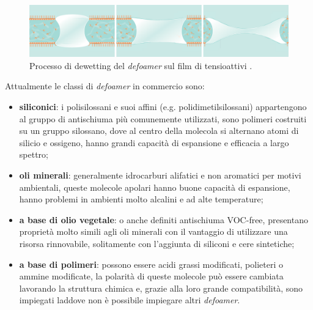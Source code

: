 \begin{figure}[htbp]
    \centering
    \includegraphics[height=.11\textheight]{fig/foamer/dewetting.png}
    \caption{Processo di dewetting del \textit{defoamer} sul film di tensioattivi \parencite{tego2014brochure}.}
    \label{fig:dewetting}
\end{figure}

Attualmente le classi di \textit{defoamer} in commercio sono:
\begin{itemize}
    \item \textbf{siliconici}: i polisilossani e suoi affini (e.g. polidimetilsilossani) appartengono al gruppo di antischiuma più comunemente utilizzati, sono polimeri costruiti su un gruppo silossano, dove al centro della molecola si alternano atomi di silicio e ossigeno, hanno grandi capacità di espansione e efficacia a largo spettro;
    \item \textbf{oli minerali}: generalmente idrocarburi alifatici e non aromatici per motivi ambientali, queste molecole apolari hanno buone capacità di espansione, hanno problemi in ambienti molto alcalini e ad alte temperature;
    \item \textbf{a base di olio vegetale}: o anche definiti antischiuma VOC-free, presentano proprietà molto simili agli oli minerali con il vantaggio di utilizzare una risorsa rinnovabile, solitamente con l'aggiunta di siliconi e cere sintetiche;
    \item \textbf{a base di polimeri}: possono essere acidi grassi modificati, polieteri o ammine modificate, la polarità di queste molecole può essere cambiata lavorando la struttura chimica e, grazie alla loro grande compatibilità, sono impiegati laddove non è possibile impiegare altri \textit{defoamer}.
\end{itemize}

